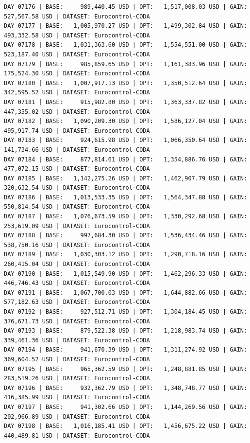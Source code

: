 \documentclass[11pt,a4paper]{article}
\begin{document}
\begin{verbatim}
DAY 07176 | BASE:     989,440.45 USD | OPT:   1,517,008.03 USD | GAIN: 527,567.58 USD | DATASET: Eurocontrol-CODA
DAY 07177 | BASE:   1,005,970.27 USD | OPT:   1,499,302.84 USD | GAIN: 493,332.58 USD | DATASET: Eurocontrol-CODA
DAY 07178 | BASE:   1,031,363.60 USD | OPT:   1,554,551.00 USD | GAIN: 523,187.40 USD | DATASET: Eurocontrol-CODA
DAY 07179 | BASE:     985,859.65 USD | OPT:   1,161,383.96 USD | GAIN: 175,524.30 USD | DATASET: Eurocontrol-CODA
DAY 07180 | BASE:   1,007,917.13 USD | OPT:   1,350,512.64 USD | GAIN: 342,595.52 USD | DATASET: Eurocontrol-CODA
DAY 07181 | BASE:     915,982.80 USD | OPT:   1,363,337.82 USD | GAIN: 447,355.02 USD | DATASET: Eurocontrol-CODA
DAY 07182 | BASE:   1,090,209.30 USD | OPT:   1,586,127.04 USD | GAIN: 495,917.74 USD | DATASET: Eurocontrol-CODA
DAY 07183 | BASE:     924,615.98 USD | OPT:   1,066,350.64 USD | GAIN: 141,734.66 USD | DATASET: Eurocontrol-CODA
DAY 07184 | BASE:     877,814.61 USD | OPT:   1,354,886.76 USD | GAIN: 477,072.15 USD | DATASET: Eurocontrol-CODA
DAY 07185 | BASE:   1,142,275.26 USD | OPT:   1,462,907.79 USD | GAIN: 320,632.54 USD | DATASET: Eurocontrol-CODA
DAY 07186 | BASE:   1,013,533.35 USD | OPT:   1,564,347.88 USD | GAIN: 550,814.54 USD | DATASET: Eurocontrol-CODA
DAY 07187 | BASE:   1,076,673.59 USD | OPT:   1,330,292.68 USD | GAIN: 253,619.09 USD | DATASET: Eurocontrol-CODA
DAY 07188 | BASE:     997,684.30 USD | OPT:   1,536,434.46 USD | GAIN: 538,750.16 USD | DATASET: Eurocontrol-CODA
DAY 07189 | BASE:   1,030,303.12 USD | OPT:   1,290,718.16 USD | GAIN: 260,415.04 USD | DATASET: Eurocontrol-CODA
DAY 07190 | BASE:   1,015,549.90 USD | OPT:   1,462,296.33 USD | GAIN: 446,746.43 USD | DATASET: Eurocontrol-CODA
DAY 07191 | BASE:   1,067,700.03 USD | OPT:   1,644,882.66 USD | GAIN: 577,182.63 USD | DATASET: Eurocontrol-CODA
DAY 07192 | BASE:     927,512.71 USD | OPT:   1,304,184.45 USD | GAIN: 376,671.73 USD | DATASET: Eurocontrol-CODA
DAY 07193 | BASE:     879,522.38 USD | OPT:   1,218,983.74 USD | GAIN: 339,461.36 USD | DATASET: Eurocontrol-CODA
DAY 07194 | BASE:     941,670.39 USD | OPT:   1,311,274.92 USD | GAIN: 369,604.52 USD | DATASET: Eurocontrol-CODA
DAY 07195 | BASE:     965,362.59 USD | OPT:   1,248,881.85 USD | GAIN: 283,519.26 USD | DATASET: Eurocontrol-CODA
DAY 07196 | BASE:     932,362.79 USD | OPT:   1,348,748.77 USD | GAIN: 416,385.99 USD | DATASET: Eurocontrol-CODA
DAY 07197 | BASE:     941,302.66 USD | OPT:   1,144,269.56 USD | GAIN: 202,966.89 USD | DATASET: Eurocontrol-CODA
DAY 07198 | BASE:   1,016,185.41 USD | OPT:   1,456,675.22 USD | GAIN: 440,489.81 USD | DATASET: Eurocontrol-CODA

\end{verbatim}
\end{document}
